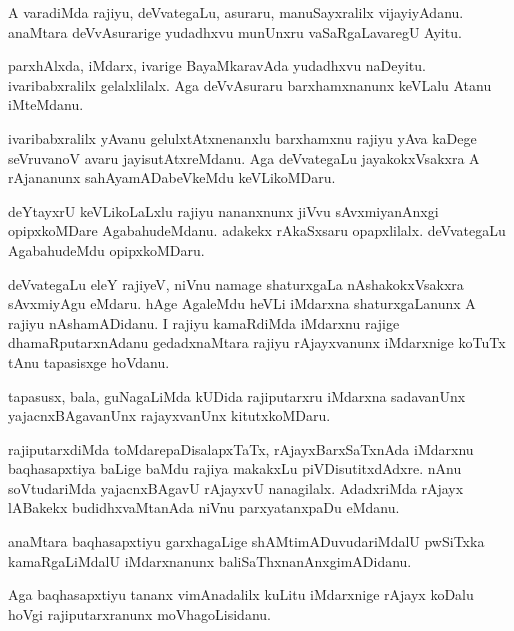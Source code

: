 \documentclass{article}
\begin{document}
\begin{mn}
A varadiMda rajiyu, deVvategaLu, asuraru, manuSayxralilx
vijayiyAdanu. anaMtara deVvAsurarige yudadhxvu munUnxru
vaSaRgaLavaregU Ayitu.
\end{mn}

\begin{mn}
parxhAlxda, iMdarx, ivarige BayaMkaravAda yudadhxvu
naDeyitu. ivaribabxralilx  gelalxlilalx. Aga deVvAsuraru
barxhamxnanunx keVLalu Atanu iMteMdanu.
\end{mn}

\begin{mn}
ivaribabxralilx yAvanu gelulxtAtxnenanxlu barxhamxnu rajiyu yAva
kaDege seVruvanoV avaru jayisutAtxreMdanu. Aga deVvategaLu
jayakokxVsakxra A rAjananunx sahAyamADabeVkeMdu keVLikoMDaru.
\end{mn}

\begin{mn}
deYtayxrU keVLikoLaLxlu rajiyu nananxnunx jiVvu sAvxmiyanAnxgi
opipxkoMDare AgabahudeMdanu. adakekx rAkaSxsaru
opapxlilalx. deVvategaLu AgabahudeMdu opipxkoMDaru.
\end{mn}

\begin{mn}%
deVvategaLu eleY rajiyeV, niVnu namage shaturxgaLa nAshakokxVsakxra
sAvxmiyAgu eMdaru. hAge AgaleMdu heVLi iMdarxna shaturxgaLanunx A
rajiyu nAshamADidanu. I rajiyu kamaRdiMda iMdarxnu rajige
dhamaRputarxnAdanu gedadxnaMtara rajiyu rAjayxvanunx iMdarxnige koTuTx
tAnu tapasisxge hoVdanu.
\end{mn}

\begin{mn}
tapasusx, bala, guNagaLiMda kUDida rajiputarxru iMdarxna sadavanUnx
yajacnxBAgavanUnx rajayxvanUnx kitutxkoMDaru.
\end{mn}

\begin{mn}%
rajiputarxdiMda toMdarepaDisalapxTaTx, rAjayxBarxSaTxnAda iMdarxnu
baqhasapxtiya baLige baMdu rajiya makakxLu piVDisutitxdAdxre. nAnu
soVtudariMda yajacnxBAgavU rAjayxvU nanagilalx. AdadxriMda rAjayx
lABakekx budidhxvaMtanAda niVnu parxyatanxpaDu eMdanu.
\end{mn}

\begin{mn}%
anaMtara baqhasapxtiyu garxhagaLige shAMtimADuvudariMdalU pwSiTxka
kamaRgaLiMdalU iMdarxnanunx baliSaThxnanAnxgimADidanu.
\end{mn}

\begin{mn}%
Aga baqhasapxtiyu tananx vimAnadalilx kuLitu iMdarxnige rAjayx koDalu
hoVgi rajiputarxranunx moVhagoLisidanu.
\end{mn}
\end{document}
